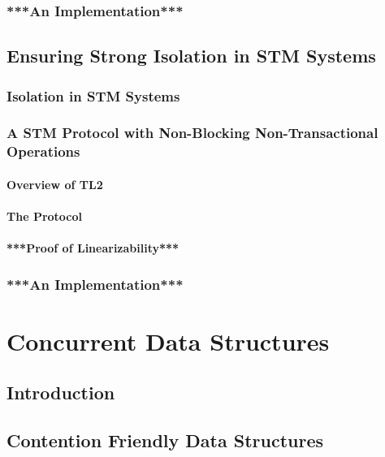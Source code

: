 \documentclass[11pt]{book}
\begin{document}
\section{***An Implementation***}



\chapter{Ensuring Strong Isolation in STM Systems}
\label{chap:decChem}
%
\section{Isolation in STM Systems}
\section{A STM Protocol with Non-Blocking Non-Transactional Operations}
\subsection{Overview of TL2}
\subsection{The Protocol}
\subsection{***Proof of Linearizability***}
\section{***An Implementation***}


\part{Concurrent Data Structures}

\chapter{Introduction}
%

\chapter{Contention Friendly Data Structures}
\label{chap:implementation}
\end{document}
